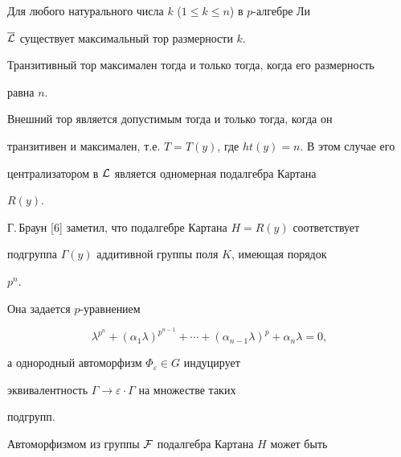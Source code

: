 \begin{cor}


Для любого натурального числа $k$ ($1\le k\le n$) в $p$-алгебре Ли


$\overline{\cal L}$ существует максимальный тор размерности $k$.


\end{cor}





\begin{cor}


Транзитивный тор максимален тогда и только тогда, когда его размерность


равна $n$.


\end{cor}





\begin{cor}


Внешний тор является допустимым тогда и только тогда, когда он


транзитивен и максимален, т.е. $T=T(y)$, где $ht(y)=n$. В этом случае его


централизатором в $\cal L$ является одномерная подалгебра Картана


$R(y)$.


\end{cor}





Г.\,Браун [6] заметил, что подалгебре Картана $H=R(y)$ соответствует


подгруппа $\Gamma(y)$ аддитивной группы поля $K$, имеющая порядок


$p^n$.


Она задается $p$-уравнением


$$


\lambda^{p^n}+(\alpha_1\lambda)^{p^{n-1}}+\dotsb+


(\alpha_{n-1}\lambda)^p+\alpha_n\lambda=0,


$$


а однородный автоморфизм $\Phi_\varepsilon\in G$ индуцирует


эквивалентность $\Gamma\to\varepsilon\cdot\Gamma$ на множестве таких


подгрупп.





Автоморфизмом из группы $\cal F$ подалгебра Картана $H$ может быть


